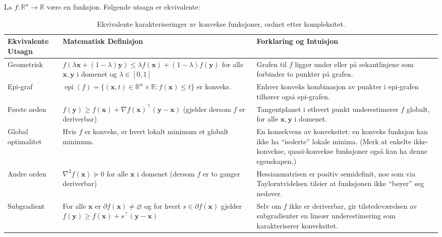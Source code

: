 La \(f:\mathbb{R}^n \to \mathbb{R}\) være en funksjon. Følgende utsagn er ekvivalente:
\begin{table}[H]
	\centering
	\small
	\begin{tabularx}{\textwidth}{|X|X|X|}
		\rowcolor{rem-color!25}
		\textbf{Ekvivalente Utsagn} & \textbf{Matematisk Definisjon} & \textbf{Forklaring og Intuisjon} \\
		\hline
		Geometrisk & 
		\( f(\lambda \symbf{x} + (1-\lambda)\symbf{y}) \le \lambda f(\symbf{x}) + (1-\lambda)f(\symbf{y}) \)  
		for alle \( \symbf{x},\symbf{y} \) i domenet og \( \lambda \in [0,1] \)
		& Grafen til \( f \) ligger under eller på sekantlinjene som forbinder to punkter på grafen. \\
		\hline
		Epi-graf &
		\(\operatorname{epi}(f) = \{ (\symbf{x},t)\in\mathbb{R}^n\times\mathbb{R} : f(\symbf{x})\le t \}\) er konveks.
		& Enhver konveks kombinasjon av punkter i epi-grafen tilhører også epi-grafen. \\
		\hline
		Første orden &
		\( f(\symbf{y}) \ge f(\symbf{x}) + \nabla f(\symbf{x})^\top (\symbf{y}-\symbf{x}) \)
		(gjelder dersom \( f \) er deriverbar)
		& Tangentplanet i ethvert punkt underestimerer \( f \) globalt, for alle \( \symbf{x},\symbf{y} \) i domenet. \\
		\hline
		Global optimalitet &
		Hvis \( f \) er konveks, er hvert lokalt minimum et globalt minimum.
		& En konsekvens av konveksitet: en konveks funksjon kan ikke ha ``isolerte'' lokale minima. (Merk at enkelte ikke-konvekse, quasi-konvekse funksjoner også kan ha denne egenskapen.) \\\hline
		Andre orden &
		\( \nabla^2 f(\symbf{x}) \succeq 0 \) for alle \( \symbf{x} \) i domenet 
		(dersom \( f \) er to ganger deriverbar)
		& Hessianmatrisen er positiv semidefinit, noe som via Taylorutvidelsen tilsier at funksjonen ikke ``bøyer'' seg nedover. \\
		\hline
		Subgradient &
		For alle \( \symbf{x} \) er \( \partial f(\symbf{x}) \neq \varnothing \) og for hvert \( s \in \partial f(\symbf{x}) \) gjelder 
		\( f(\symbf{y}) \ge f(\symbf{x}) + s^\top (\symbf{y}-\symbf{x}) \)
		& Selv om \( f \) ikke er deriverbar, gir tilstedeværelsen av subgradienter en lineær underestimering som karakteriserer konveksitet. 
		\\
		\hline
	\end{tabularx}
	\caption{Ekvivalente karakteriseringer av konvekse funksjoner, ordnet etter kompleksitet.}
	\label{tab:convex_equivalence}
\end{table}

